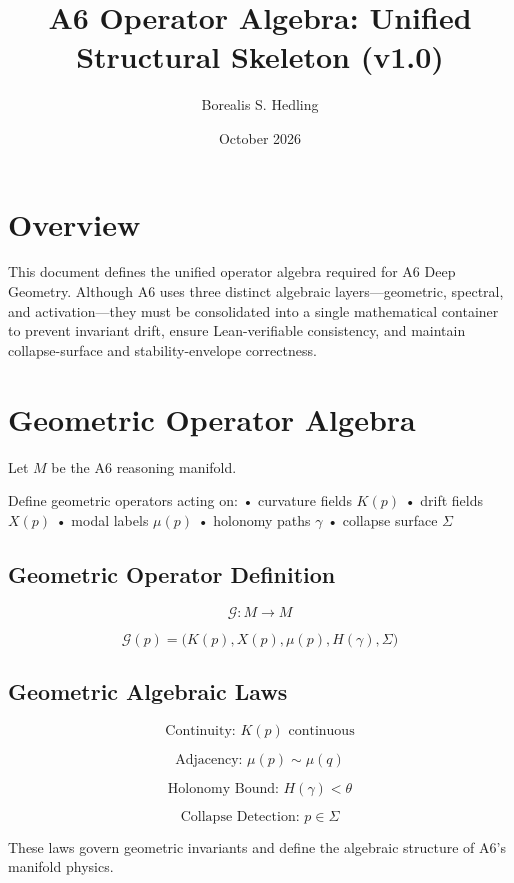 \documentclass[11pt]{article}
\title{A6 Operator Algebra: Unified Structural Skeleton (v1.0)}
\author{Borealis S. Hedling}
\date{October 2026}
\begin{document}
\maketitle

\section*{Overview}

This document defines the unified operator algebra required for A6 Deep
Geometry. Although A6 uses three distinct algebraic layers—geometric,
spectral, and activation—they must be consolidated into a single mathematical
container to prevent invariant drift, ensure Lean-verifiable consistency, and
maintain collapse-surface and stability-envelope correctness.

\section{Geometric Operator Algebra}

Let $M$ be the A6 reasoning manifold.

Define geometric operators acting on:
  • curvature fields $K(p)$  
  • drift fields $X(p)$  
  • modal labels $\mu(p)$  
  • holonomy paths $\gamma$  
  • collapse surface $\Sigma$

\subsection{Geometric Operator Definition}

\[
\mathcal{G} : M \to M
\]

\[
\mathcal{G}(p) =
  \big( K(p), X(p), \mu(p), H(\gamma), \Sigma \big)
\]

\subsection{Geometric Algebraic Laws}

\[
\text{Continuity: } K(p) \text{ continuous}
\]

\[
\text{Adjacency: } \mu(p) \sim \mu(q)
\]

\[
\text{Holonomy Bound: } H(\gamma) < \theta
\]

\[
\text{Collapse Detection: } p \in \Sigma
\]

These laws govern geometric invariants and define the algebraic structure of
A6’s manifold physics.
\end{document}

